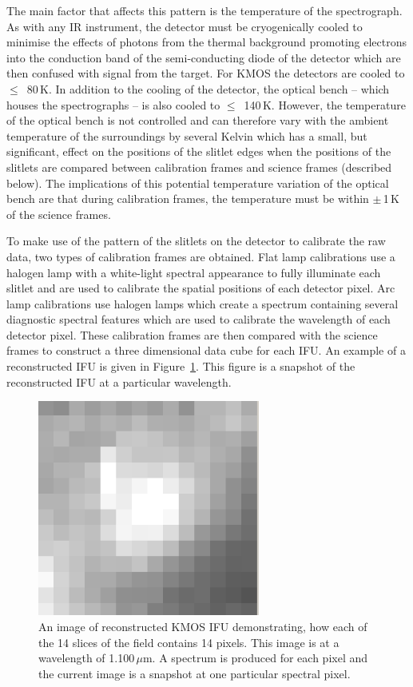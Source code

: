 The main factor that affects this pattern is the temperature of the spectrograph.
As with any IR instrument, the detector must be cryogenically cooled to minimise the effects of photons from the thermal background promoting electrons into the conduction band of the semi-conducting diode of the detector which are then confused with signal from the target.
For KMOS the detectors are cooled to $\le$~80\,K.
In addition to the cooling of the detector, the optical bench -- which houses the spectrographs -- is also cooled to $\le$~140\,K.
However, the temperature of the optical bench is not controlled and can therefore vary with the ambient temperature of the surroundings by several Kelvin which has a small, but significant, effect on the positions of the slitlet edges when the positions of the slitlets are compared between calibration frames and science frames (described below).
The implications of this potential temperature variation of the optical bench are that during calibration frames, the temperature must be within $\pm$\,1\,K of the science frames.

To make use of the pattern of the slitlets on the detector to calibrate the raw data, two types of calibration frames are obtained.
Flat lamp calibrations use a halogen lamp with a white-light spectral appearance to fully illuminate each slitlet and are used to calibrate the spatial positions of each detector pixel.
Arc lamp calibrations use halogen lamps which create a spectrum containing several diagnostic spectral features which are used to calibrate the wavelength of each detector pixel.
These calibration frames are then compared with the science frames to construct a three dimensional data cube for each IFU.
An example of a reconstructed IFU is given in Figure~\ref{fig:kmosIFU}.
This figure is a snapshot of the reconstructed IFU at a particular wavelength.

\begin{figure}
 \centering
 \includegraphics[width=0.65\textwidth]{kmos/kmos-ifu}
 \caption[Example of a KMOS IFU]{An image of reconstructed KMOS IFU demonstrating, how each of the 14 slices of the field contains 14 pixels.
 This image is at a wavelength of 1.100\,$\mu$m.
 A spectrum is produced for each pixel and the current image is a snapshot at one particular spectral pixel.
 \label{fig:kmosIFU}}
\end{figure}


